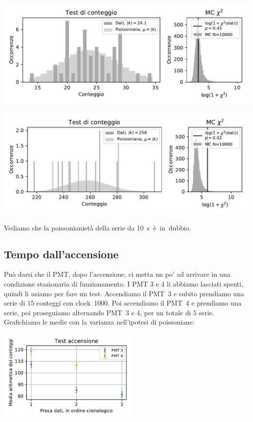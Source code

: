 \documentclass[a4paper]{article}
\begin{document}
\noindent\includegraphics[width=\textwidth]{fig6a}

\noindent\includegraphics[width=\textwidth]{fig6b}

Vediamo che la poissonianietà della serie da \SI{10}s è in dubbio.

\subsection*{Tempo dall'accensione}

Può darsi che il PMT, dopo l'accensione, ci metta un po' ad arrivare in una condizione stazionaria di funzionamento.
I PMT 3 e 4 li abbiamo lasciati spenti, quindi li usiamo per fare un test.
Accendiamo il PMT~3 e subito prendiamo una serie di 15 conteggi con clock~1000.
Poi accendiamo il PMT~4 e prendiamo una serie, poi proseguiamo alternando PMT~3 e 4,
per un totale di 5 serie. Grafichiamo le medie con la varianza nell'ipotesi di poissoniane:

\includegraphics[width=7cm]{fig6c}
\end{document}
